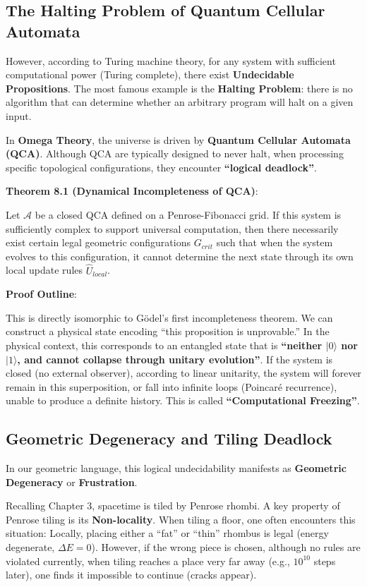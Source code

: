 \subsection{The Halting Problem of Quantum Cellular Automata}

However, according to Turing machine theory, for any system with sufficient computational power (Turing complete), there exist \textbf{Undecidable Propositions}. The most famous example is the \textbf{Halting Problem}: there is no algorithm that can determine whether an arbitrary program will halt on a given input.

In \textbf{Omega Theory}, the universe is driven by \textbf{Quantum Cellular Automata (QCA)}. Although QCA are typically designed to never halt, when processing specific topological configurations, they encounter \textbf{``logical deadlock''}.

\textbf{Theorem 8.1 (Dynamical Incompleteness of QCA)}:

Let $\mathcal{A}$ be a closed QCA defined on a Penrose-Fibonacci grid. If this system is sufficiently complex to support universal computation, then there necessarily exist certain legal geometric configurations $G_{crit}$ such that when the system evolves to this configuration, it cannot determine the next state through its own local update rules $\hat{U}_{local}$.

\textbf{Proof Outline}:

This is directly isomorphic to G\"{o}del's first incompleteness theorem. We can construct a physical state encoding ``this proposition is unprovable.'' In the physical context, this corresponds to an entangled state that is \textbf{``neither $|0\rangle$ nor $|1\rangle$, and cannot collapse through unitary evolution''}. If the system is closed (no external observer), according to linear unitarity, the system will forever remain in this superposition, or fall into infinite loops (Poincar\'{e} recurrence), unable to produce a definite history. This is called \textbf{``Computational Freezing''}.

\subsection{Geometric Degeneracy and Tiling Deadlock}

In our geometric language, this logical undecidability manifests as \textbf{Geometric Degeneracy} or \textbf{Frustration}.

Recalling Chapter 3, spacetime is tiled by Penrose rhombi. A key property of Penrose tiling is its \textbf{Non-locality}. When tiling a floor, one often encounters this situation:
Locally, placing either a ``fat'' or ``thin'' rhombus is legal (energy degenerate, $\Delta E = 0$). However, if the wrong piece is chosen, although no rules are violated currently, when tiling reaches a place very far away (e.g., $10^{10}$ steps later), one finds it impossible to continue (cracks appear).

